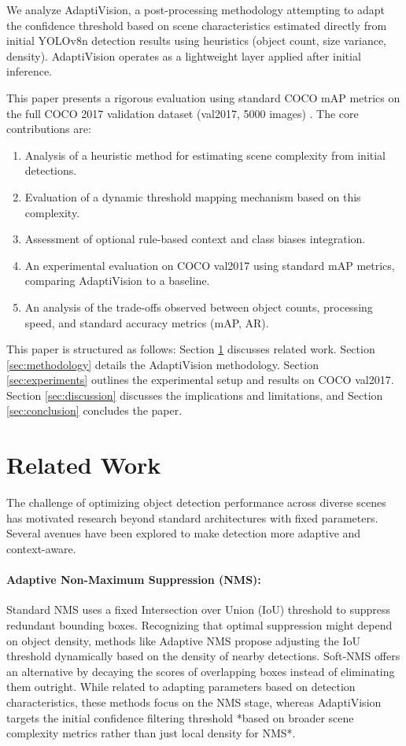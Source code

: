 \documentclass{article}
\begin{document}
We analyze AdaptiVision, a post-processing methodology attempting to adapt the confidence threshold based on scene characteristics estimated directly from initial YOLOv8n \cite{YOLOv8} detection results using heuristics (object count, size variance, density). AdaptiVision operates as a lightweight layer applied after initial inference.

This paper presents a rigorous evaluation using standard COCO mAP metrics on the full COCO 2017 validation dataset (val2017, 5000 images) \cite{COCO}. The core contributions are:
\begin{enumerate}
    \item Analysis of a heuristic method for estimating scene complexity from initial detections.
    \item Evaluation of a dynamic threshold mapping mechanism based on this complexity.
    \item Assessment of optional rule-based context and class biases integration.
    \item An experimental evaluation on COCO val2017 using standard mAP metrics, comparing AdaptiVision to a baseline.
    \item An analysis of the trade-offs observed between object counts, processing speed, and standard accuracy metrics (mAP, AR).
\end{enumerate}

This paper is structured as follows: Section \ref{sec:related} discusses related work. Section \ref{sec:methodology} details the AdaptiVision methodology. Section \ref{sec:experiments} outlines the experimental setup and results on COCO val2017. Section \ref{sec:discussion} discusses the implications and limitations, and Section \ref{sec:conclusion} concludes the paper.

\section{Related Work} \label{sec:related}

The challenge of optimizing object detection performance across diverse scenes has motivated research beyond standard architectures with fixed parameters. Several avenues have been explored to make detection more adaptive and context-aware.

\paragraph{Adaptive Non-Maximum Suppression (NMS):} Standard NMS uses a fixed Intersection over Union (IoU) threshold to suppress redundant bounding boxes. Recognizing that optimal suppression might depend on object density, methods like Adaptive NMS \cite{AdaptiveNMS} propose adjusting the IoU threshold dynamically based on the density of nearby detections. Soft-NMS \cite{SoftNMS} offers an alternative by decaying the scores of overlapping boxes instead of eliminating them outright. While related to adapting parameters based on detection characteristics, these methods focus on the NMS stage, whereas AdaptiVision targets the initial confidence filtering threshold *based on broader scene complexity metrics rather than just local density for NMS*.
\end{document}
